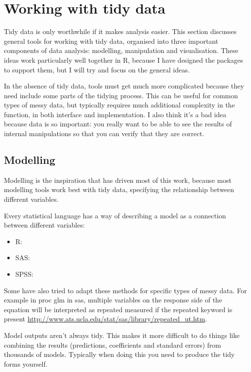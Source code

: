 \documentclass[oneside]{article}
\begin{document}
\section{Working with tidy data}

Tidy data is only worthwhile if it makes analysis easier. This section discusses general tools for working with tidy data, organised into three important components of data analysis: modelling, manipulation and visualisation. These ideas work particularly well together in R, because I have designed the packages to support them, but I will try and focus on the general ideas. 

In the absence of tidy data, tools must get much more complicated because they need include some parts of the tidying process. This can be useful for common types of messy data, but typically requires much additional complexity in the function, in both interface and implementation. I also think it's a bad idea because data is so important: you really want to be able to see the results of internal manipulations so that you can verify that they are correct.

\subsection{Modelling}

Modelling is the inspiration that has driven most of this work, because most modelling tools work best with tidy data, specifying the relationship between different variables. 

Every statistical language has a way of describing a model as a connection between different variables:

\begin{itemize}

\item R:
\item SAS:
\item SPSS:
\end{itemize}

Some have also tried to adapt these methods for specific types of messy data. For example in {\sc proc glm} in {\sc sas}, multiple variables on the response side of the equation will be interpreted as repeated measured if the {\sc repeated} keyword is present \url{http://www.ats.ucla.edu/stat/sas/library/repeated_ut.htm}.

Model outputs aren't always tidy. This makes it more difficult to do things like combining the results (predictions, coefficients and standard errors) from thousands of models. Typically when doing this you need to produce the tidy forms yourself.
\end{document}
